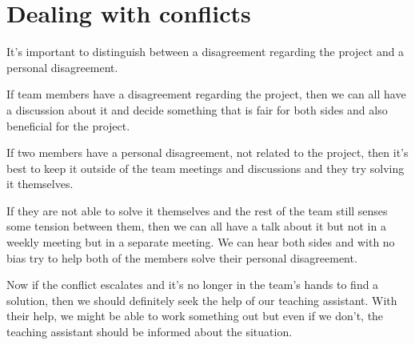 \section{Dealing with conflicts}

It's important to distinguish between a disagreement regarding the project and a personal disagreement.

If team members have a disagreement regarding the project,
then we can all have a discussion about it and decide something that is fair for both sides and also beneficial for the project.

If two members have a personal disagreement, not related to the project,
then it's best to keep it outside of the team meetings and discussions and they try solving it themselves.

If they are not able to solve it themselves and the rest of the team still senses some tension between them,
then we can all have a talk about it but not in a weekly meeting but in a separate meeting.
We can hear both sides and with no bias try to help both of the members solve their personal disagreement.

Now if the conflict escalates and it's no longer in the team's hands to find a solution,
then we should definitely seek the help of our teaching assistant.
With their help, we might be able to work something out but even if we don't, the teaching assistant should be informed about the situation.